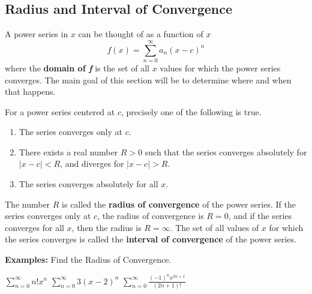\subsection*{Radius and Interval of Convergence}
A power series in $x$ can be thought of as a function of $x$
\[f(x)=\sum_{n=0}^{\infty}a_n (x-c)^n\]
where the \textbf{domain of \textit{f}} is the set of all $x$ values for which the power series converges. The main goal of this section will be to determine where and when that happens.


\begin{tcolorbox}[title= CONVERGENCE OF A POWER SERIES,colframe=black,sharp corners,colback=white,colbacktitle=white,coltitle=black]

    For a power series centered at $c$, precisely one of the following is true.
    
    \begin{enumerate}
        \item The series converges only at $c$.
        \item There exists a real number $R>0$ such that the series converges absolutely for $|x-c|<R$, and diverges for $|x-c|>R$.
        \item The series converges absolutely for all $x$.
    \end{enumerate}
    The number $R$ is called the \textbf{radius of convergence} of the power series. If the series converges only at $c$, the radius of convergence is $R=0$, and if the series converges for all $x$, then the radius is $R=\infty$. The set of all values of $x$ for which the series converges is called the \textbf{interval of convergence} of the power series.

\end{tcolorbox}
\vspace{.1in}


\noindent\textbf{Examples:} Find the Radius of Convergence.
\begin{questions}
    \question $\displaystyle\sum_{n=0}^{\infty}n!x^n$
    \question $\displaystyle\sum_{n=0}^{\infty}3(x-2)^n$
    \question$\displaystyle\sum_{n=0}^{\infty}\frac{(-1)^n x^{2n+1}}{(2n+1)!}$
    

\end{questions}

